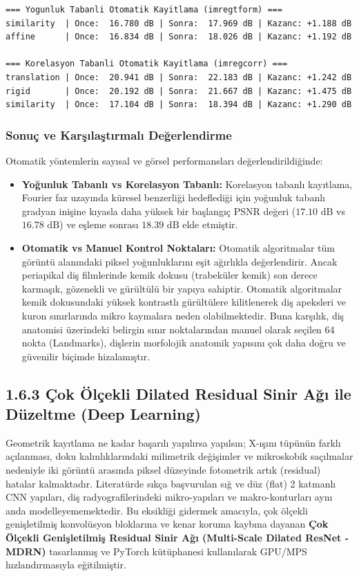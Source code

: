 \documentclass[12pt,a4paper]{article}
\begin{document}
\begin{lstlisting}[caption={Otomatik kayıtlama yöntemleri karşılaştırma terminal çıktısı}, label={lst:auto_terminal}]
=== Yogunluk Tabanli Otomatik Kayitlama (imregtform) ===
similarity  | Once:  16.780 dB | Sonra:  17.969 dB | Kazanc: +1.188 dB
affine      | Once:  16.834 dB | Sonra:  18.026 dB | Kazanc: +1.192 dB

=== Korelasyon Tabanli Otomatik Kayitlama (imregcorr) ===
translation | Once:  20.941 dB | Sonra:  22.183 dB | Kazanc: +1.242 dB
rigid       | Once:  20.192 dB | Sonra:  21.667 dB | Kazanc: +1.475 dB
similarity  | Once:  17.104 dB | Sonra:  18.394 dB | Kazanc: +1.290 dB
\end{lstlisting}

\subsubsection{Sonuç ve Karşılaştırmalı Değerlendirme}
Otomatik yöntemlerin sayısal ve görsel performansları değerlendirildiğinde:
\begin{itemize}
    \item \textbf{Yoğunluk Tabanlı vs Korelasyon Tabanlı:} Korelasyon tabanlı kayıtlama, Fourier faz uzayında küresel benzerliği hedeflediği için yoğunluk tabanlı gradyan inişine kıyasla daha yüksek bir başlangıç PSNR değeri ($17.10\text{ dB}$ vs $16.78\text{ dB}$) ve eşleme sonrası $18.39\text{ dB}$ elde etmiştir.
    \item \textbf{Otomatik vs Manuel Kontrol Noktaları:} Otomatik algoritmalar tüm görüntü alanındaki piksel yoğunluklarını eşit ağırlıkla değerlendirir. Ancak periapikal diş filmlerinde kemik dokusu (trabeküler kemik) son derece karmaşık, gözenekli ve gürültülü bir yapıya sahiptir. Otomatik algoritmalar kemik dokusundaki yüksek kontrastlı gürültülere kilitlenerek diş apeksleri ve kuron sınırlarında mikro kaymalara neden olabilmektedir. Buna karşılık, diş anatomisi üzerindeki belirgin sınır noktalarından manuel olarak seçilen 64 nokta (Landmarks), dişlerin morfolojik anatomik yapısını çok daha doğru ve güvenilir biçimde hizalamıştır.
\end{itemize}

\newpage
\subsection{1.6.3 Çok Ölçekli Dilated Residual Sinir Ağı ile Düzeltme (Deep Learning)}
Geometrik kayıtlama ne kadar başarılı yapılırsa yapılsın; X-ışını tüpünün farklı açılanması, doku kalınlıklarındaki milimetrik değişimler ve mikroskobik saçılmalar nedeniyle iki görüntü arasında piksel düzeyinde fotometrik artık (residual) hatalar kalmaktadır. Literatürde sıkça başvurulan sığ ve düz (flat) 2 katmanlı CNN yapıları, diş radyografilerindeki mikro-yapıları ve makro-konturları aynı anda modelleyememektedir. Bu eksikliği gidermek amacıyla, çok ölçekli genişletilmiş konvolüsyon bloklarına ve kenar koruma kaybına dayanan \textbf{Çok Ölçekli Genişletilmiş Residual Sinir Ağı (Multi-Scale Dilated ResNet - MDRN)} tasarlanmış ve PyTorch kütüphanesi kullanılarak GPU/MPS hızlandırmasıyla eğitilmiştir.
\end{document}
